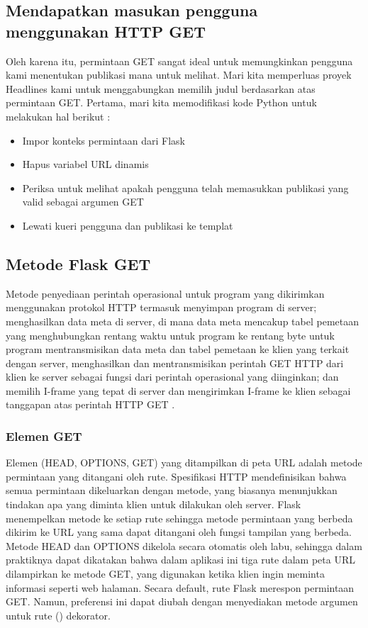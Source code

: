\subsection{Mendapatkan masukan pengguna menggunakan HTTP GET}
Oleh karena itu, permintaan GET sangat ideal untuk memungkinkan pengguna kami menentukan publikasi mana untuk melihat. Mari kita memperluas proyek Headlines kami untuk menggabungkan memilih judul berdasarkan atas permintaan GET. Pertama, mari kita memodifikasi kode Python untuk melakukan hal berikut \cite{dwyer2016flask}:
\begin{itemize}
\item Impor konteks permintaan dari Flask
\item Hapus variabel URL dinamis
\item Periksa untuk melihat apakah pengguna telah memasukkan publikasi yang valid sebagai argumen GET
\item Lewati kueri pengguna dan publikasi ke templat
\end{itemize}
\subsection{Metode Flask GET}
Metode penyediaan perintah operasional untuk program  yang dikirimkan menggunakan protokol HTTP termasuk menyimpan program  di server; menghasilkan data meta di server, di mana data meta mencakup tabel pemetaan yang menghubungkan rentang waktu untuk program  ke rentang byte untuk program  mentransmisikan data meta dan tabel pemetaan ke klien yang terkait dengan server, menghasilkan dan mentransmisikan perintah GET HTTP dari klien  ke server sebagai fungsi dari perintah operasional yang diinginkan; dan memilih I-frame yang tepat di server dan mengirimkan I-frame ke klien sebagai tanggapan atas perintah HTTP GET \cite{xu2006method}.
\subsubsection{Elemen GET}
Elemen (HEAD, OPTIONS, GET) yang ditampilkan di peta URL adalah metode permintaan yang ditangani oleh rute. Spesifikasi HTTP mendefinisikan bahwa semua permintaan dikeluarkan dengan metode, yang biasanya menunjukkan tindakan apa yang diminta klien untuk dilakukan oleh server. Flask menempelkan metode ke setiap rute sehingga metode permintaan yang berbeda dikirim ke URL yang sama dapat ditangani oleh fungsi tampilan yang berbeda.
Metode HEAD dan OPTIONS dikelola secara otomatis oleh labu, sehingga dalam praktiknya dapat dikatakan bahwa dalam aplikasi ini tiga rute dalam peta URL dilampirkan ke metode GET, yang digunakan ketika klien ingin meminta informasi seperti web halaman. Secara default, rute Flask merespon permintaan GET. Namun, preferensi ini dapat diubah dengan menyediakan metode argumen untuk rute () dekorator\cite{grinberg2018flask}.

